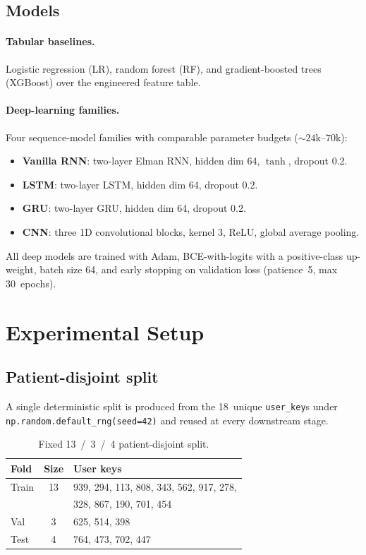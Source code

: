 \documentclass[11pt,a4paper]{article}
\begin{document}
\subsection{Models}

\paragraph{Tabular baselines.}
Logistic regression (LR), random forest (RF), and gradient-boosted
trees (XGBoost) over the engineered feature table.

\paragraph{Deep-learning families.}
Four sequence-model families with comparable parameter budgets
(${\sim}24$k--$70$k):
\begin{itemize}[nosep,leftmargin=*]
  \item \textbf{Vanilla RNN}: two-layer Elman RNN, hidden dim 64,
        $\tanh$, dropout 0.2.
  \item \textbf{LSTM}: two-layer LSTM, hidden dim 64, dropout 0.2.
  \item \textbf{GRU}: two-layer GRU, hidden dim 64, dropout 0.2.
  \item \textbf{CNN}: three 1D convolutional blocks, kernel 3, ReLU,
        global average pooling.
\end{itemize}
All deep models are trained with Adam, BCE-with-logits with a
positive-class up-weight, batch size 64, and early stopping on
validation loss (patience~5, max 30~epochs).

\section{Experimental Setup}\label{sec:setup}

\subsection{Patient-disjoint split}

A single deterministic split is produced from the 18~unique
\texttt{user\_key}s under \texttt{np.random.default\_rng(seed=42)} and
reused at every downstream stage.

\begin{table}[H]
\centering
\caption{Fixed 13~/~3~/~4 patient-disjoint split.}
\label{tab:split}
\small
\begin{tabular}{lcl}
\toprule
\textbf{Fold} & \textbf{Size} & \textbf{User keys} \\
\midrule
Train & 13 & 939, 294, 113, 808, 343, 562, 917, 278,\\
      &    & 328, 867, 190, 701, 454 \\
Val   &  3 & 625, 514, 398 \\
Test  &  4 & 764, 473, 702, 447 \\
\bottomrule
\end{tabular}
\end{table}
\end{document}
